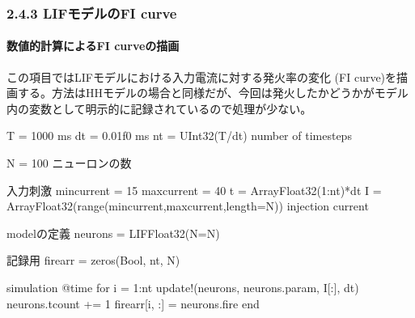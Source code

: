 \documentclass[letterpaper,10pt,english]{sphinxmanual}
\begin{document}
\begin{sphinxVerbatim}[commandchars=\\\{\}]
   \PYG{p}{[} \PYG{p}{]} 
   \PYG{p}{[} \PYG{p}{]} 
  
      \PYG{p}{[} \PYG{p}{]} 
     \PYG{p}{[} \PYG{p}{]}
        \PYG{p}{[} \PYG{p}{]}  
\end{sphinxVerbatim}


\subsubsection{2.4.3 LIFモデルのF\sphinxhyphen{}I curve}
\label{\detokenize{2-4_lif:liff-i-curve}}

\paragraph{数値的計算によるF\sphinxhyphen{}I curveの描画}
\label{\detokenize{2-4_lif:f-i-curve}}
この項目ではLIFモデルにおける入力電流に対する発火率の変化 (F\sphinxhyphen{}I curve)を描画する。方法はHHモデルの場合と同様だが、今回は発火したかどうかがモデル内の変数として明示的に記録されているので処理が少ない。

\begin{sphinxVerbatim}[commandchars=\\\{\}]
T = 1000 \PYGZsh{} ms
dt = 0.01f0 \PYGZsh{} ms
nt = UInt32(T/dt) \PYGZsh{} number of timesteps

N = 100 \PYGZsh{} ニューロンの数

\PYGZsh{} 入力刺激
mincurrent = 15
maxcurrent = 40
t = Array\PYGZob{}Float32\PYGZcb{}(1:nt)*dt
I = Array\PYGZob{}Float32\PYGZcb{}(range(mincurrent,maxcurrent,length=N)) \PYGZsh{} injection current

\PYGZsh{} modelの定義
neurons = LIF\PYGZob{}Float32\PYGZcb{}(N=N)

\PYGZsh{} 記録用
firearr = zeros(Bool, nt, N)

\PYGZsh{} simulation
@time for i = 1:nt
    update!(neurons, neurons.param, I[:], dt)
    neurons.tcount += 1
    firearr[i, :] = neurons.fire
end
\end{sphinxVerbatim}
\end{document}
